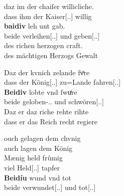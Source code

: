 \begin{exe}
\ex \label{ex:konjadjvvbeidiu}
	\begin{xlist}
	\ex \label{ex:konjadjvvbeidiu_1} %
		\gll daz im der chaiſer willicliche. \\
			dass ihm der Kaiser[\Nom.\Sg.\MascM] willig \\
	\sn \gll \textbf{baidiv} leh unt gab. \\
			beide verleihen[\Tsg\subM.\Ind.\Pst] und
			geben[\Tsg\subM.\Ind.\Pst] \\
	\sn \gll des richen herzogen craft. \\
			des mächtigen Herzogs Gewalt \\
		\begin{taggedline}{\parencites[\pno~73\ra, 19--21]{kc:A1}[vgl.][17108--17110]{schroeder1895}}
		\trans {}
		\end{taggedline}

	\ex \label{ex:konjadjvvbeidiu_2} %
		\gll Daz der kvnich zelande fvͦre \\
			dass der König[\Nom.\Sg.\MascM] zu=Lande
			fahren[\Tsg\subM.\Sbjv.\Pst] \\
	\sn \gll \textbf{Beidiv} lobte vnd ſwuͤre \\
			beide geloben-\Tsg\subM.\Sbjv.\Pst{} und
			schwören[\Tsg\subM.\Sbjv.\Pst] \\
	\sn \gll Daz er daz riche rehte rihte \\
			dass er das Reich recht regiere \\
		\begin{taggedline}{\parencites[\pno~102\ra, 43]{kc:VB}[zu][15366--15368]{schroeder1895}}
		\trans {}
		\end{taggedline}

	\ex \label{ex:konjadjvvbeidiu_3} %
		\begin{taggedline}{\parencites[\pno~42\vb, 42--44]{kc:B1}[vgl.][15880--15882]{schroeder1895}}
		\gll ouch gelagen dem chvnig \\
			auch lagen dem König \\
	\sn \gll Mænig held frûmig \\
			viel Held[\Nom.\Pl.\MascM] tapfer \\
	\sn \gll \textbf{Beidíu} wund vnd tot \\
			beide verwundet[\Nom.\Pl.\MascM] und tot[\Nom.\Pl.\MascM] \\
		\end{taggedline}


\end{xlist}
\end{exe}

